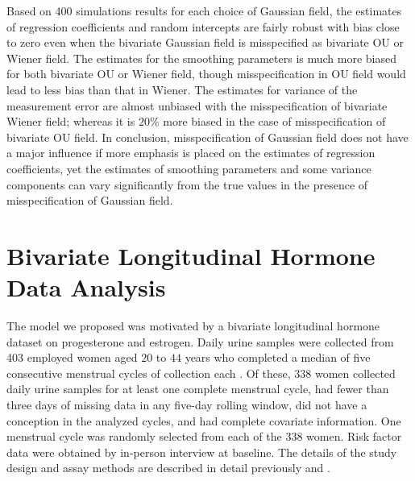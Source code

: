 \documentclass[review]{elsarticle}
\begin{document}
Based on 400 simulations results for each choice of Gaussian field, the estimates of regression coefficients and random intercepts are fairly robust with bias close to zero even when the bivariate Gaussian field is misspecified as bivariate OU or Wiener field. The estimates for the smoothing parameters is much more biased for both bivariate OU or Wiener field, though misspecification in OU field would lead to less bias than that in Wiener. The estimates for variance of the measurement error are almost unbiased with the misspecification of bivariate Wiener field; whereas it is $20\%$ more biased in the case of misspecification of bivariate OU field. In conclusion, misspecification of Gaussian field does not  have a major influence if more emphasis is placed on the estimates of regression coefficients, yet the estimates of smoothing parameters and some variance components can vary significantly from the true values in the presence of misspecification of Gaussian field. 

%
%
%

\section{Bivariate Longitudinal Hormone Data Analysis} \label{dataAnalysis}

The model we proposed was motivated by a bivariate longitudinal hormone dataset on progesterone and estrogen.
Daily urine samples were collected from 403 employed women aged $20$ to $44$ years who completed a median of five consecutive menstrual cycles of collection each \cite{Gold:Eske:Lasl:Samu:O'Nei:Over:Sche:quan:1995}. Of these, $338$ women collected daily urine samples for at least one complete menstrual cycle, had fewer than three days of missing data in any five-day rolling window, did not have a conception in the analyzed cycles, and had complete covariate information. One menstrual cycle was randomly selected from each of the $338$ women. 
Risk factor data were obtained by in-person interview at baseline. The details of the study design and assay methods are described in detail previously \cite{Gold:Eske:Lasl:Samu:O'Nei:Over:Sche:quan:1995} and \cite{Gold:Eske:Hamm:Lasl:Samu:O'Nei:Hine:Over:Sche:quan:1995}. 
\end{document}
